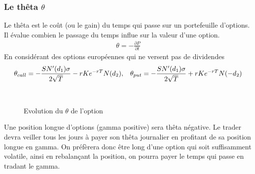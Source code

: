 \documentclass[a4paper]{article}
\begin{document}
\subsubsection{Le thêta $\theta$}
Le thêta est le coût (ou le gain) du temps qui passe sur un portefeuille d'options. Il évalue combien le passage du temps influe sur la valeur d'une option. 
\begin{align*}
    \theta = - \frac{\partial P}{\partial t}
\end{align*}
En considérant des options européennes qui ne versent pas de dividendes
\begin{align*}
    \theta_{call} = -\frac{S N'(d_1) \sigma}{2 \sqrt{T}} - r K e^{- r T} N(d_2), \hspace{3mm} \theta_{put} = -\frac{S N'(d_1) \sigma}{2 \sqrt{T}} + r K e^{- r T} N(- d_2)
\end{align*}
\begin{figure}[H]
 \\
\caption{Evolution du $\theta$ de l'option}
\end{figure} 
Une position longue d'options (gamma positive) sera thêta négative. Le trader devra veiller tous les jours à payer son thêta journalier en profitant de sa position longue en gamma. On préfèrera donc être long d'une option qui soit suffisamment volatile, ainsi en rebalançant la position, on pourra payer le temps qui passe en tradant le gamma.
\end{document}
